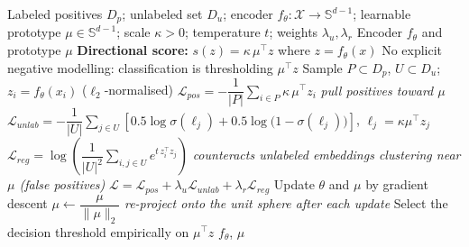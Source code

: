 \documentclass{article}
\begin{document}
\begin{algorithm}[!h]
\renewcommand{\algorithmicrequire}{\textbf{Input:}} %
\renewcommand{\algorithmicensure}{\textbf{Output:}} %
	\caption{AngularPU (hyperspherical PU learning with angular regularization)} %
	\begin{algorithmic}[1] %
	    \REQUIRE
	    Labeled positives $D_{p}$; unlabeled set $D_{u}$;
	    encoder $f_{\theta}:\mathcal{X}\to\mathbb{S}^{d-1}$; learnable prototype $\mu\in\mathbb{S}^{d-1}$;
	    scale $\kappa>0$; temperature $t$; weights $\lambda_{u},\lambda_{r}$
	    \ENSURE
	    Encoder $f_{\theta}$ and prototype $\mu$
	    \STATE \textbf{Directional score:} $s(z)=\kappa\,\mu^{\top}z$ where $z=f_{\theta}(x)$ %
	    \STATE \quad No explicit negative modelling: classification is thresholding $\mu^{\top}z$ %
	    \STATE Sample $P\subset D_{p}$, $U\subset D_{u}$;\quad $z_{i}=f_{\theta}(x_{i})$ ($\ell_{2}$-normalised)
	    \STATE $\mathcal{L}_{pos}=-\dfrac{1}{|P|}\sum_{i\in P}\kappa\,\mu^{\top}z_{i}$
	    \hfill \emph{pull positives toward $\mu$}
	    \STATE $\mathcal{L}_{unlab}=-\dfrac{1}{|U|}\sum_{j\in U}\left[0.5\log\sigma(\ell_{j})+0.5\log\big(1-\sigma(\ell_{j})\big)\right]$,\quad
	    $\ell_{j}=\kappa\mu^{\top}z_{j}$ %
	    \STATE $\mathcal{L}_{reg}=\log\left(\dfrac{1}{|U|^{2}}\sum_{i,j\in U}e^{t\,z_{i}^{\top}z_{j}}\right)$ %
	    \STATE \quad \emph{counteracts unlabeled embeddings clustering near $\mu$ (false positives)} %
	    \STATE $\mathcal{L}=\mathcal{L}_{pos}+\lambda_{u}\mathcal{L}_{unlab}+\lambda_{r}\mathcal{L}_{reg}$
	    \STATE Update $\theta$ and $\mu$ by gradient descent
	    \STATE $\mu\leftarrow \dfrac{\mu}{\|\mu\|_{2}}$
	    \hfill \emph{re-project onto the unit sphere after each update} %
	    \ENDWHILE
	    \STATE Select the decision threshold empirically on $\mu^{\top}z$ %
		\RETURN $f_{\theta}$, $\mu$
	\end{algorithmic}
\end{algorithm}
\end{document}

